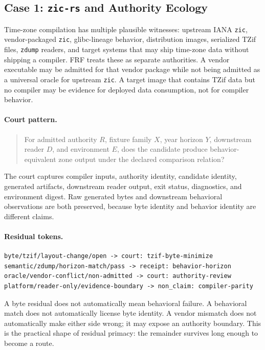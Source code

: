 \documentclass[11pt,a4paper]{article}
\newcommand{\frf}{\textsc{FRF}}
\begin{document}
\subsection{Case 1: \texttt{zic-rs} and Authority Ecology}

Time-zone compilation has multiple plausible witnesses: upstream IANA \texttt{zic}, vendor-packaged \texttt{zic}, glibc-lineage behavior, distribution images, serialized TZif files, \texttt{zdump} readers, and target systems that may ship time-zone data without shipping a compiler. \frf{} treats these as separate authorities. A vendor executable may be admitted for that vendor package while not being admitted as a universal oracle for upstream \texttt{zic}. A target image that contains TZif data but no compiler may be evidence for deployed data consumption, not for compiler behavior.

\paragraph{Court pattern.}
\begin{quote}
For admitted authority \(R\), fixture family \(X\), year horizon \(Y\), downstream reader \(D\), and environment \(E\), does the candidate produce behavior-equivalent zone output under the declared comparison relation?
\end{quote}
The court captures compiler inputs, authority identity, candidate identity, generated artifacts, downstream reader output, exit status, diagnostics, and environment digest. Raw generated bytes and downstream behavioral observations are both preserved, because byte identity and behavior identity are different claims.

\paragraph{Residual tokens.}
\begin{verbatim}
byte/tzif/layout-change/open -> court: tzif-byte-minimize
semantic/zdump/horizon-match/pass -> receipt: behavior-horizon
oracle/vendor-conflict/non-admitted -> court: authority-review
platform/reader-only/evidence-boundary -> non_claim: compiler-parity
\end{verbatim}
A byte residual does not automatically mean behavioral failure. A behavioral match does not automatically license byte identity. A vendor mismatch does not automatically make either side wrong; it may expose an authority boundary. This is the practical shape of residual primacy: the remainder survives long enough to become a route.
\end{document}
